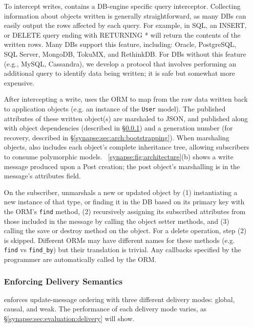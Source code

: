 To intercept writes, \synapse contains a DB-engine specific query interceptor.
Collecting information about objects written is
generally straightforward, as many DBs can easily output the rows affected
by each query. For example, in SQL, an {\code INSERT}, or {\code DELETE}
query ending with {\code RETURNING *} will return the contents of the
written rows. Many DBs support this feature, including: Oracle, PostgreSQL, SQL
Server, MongoDB, TokuMX, and RethinkDB. For DBs without this feature
(e.g., MySQL, Cassandra), we develop a protocol that involves performing an additional
query to identify data being written; it is safe but somewhat more expensive.

After intercepting a write, \synapse uses the ORM to map from the raw data
written back to application objects (e.g. an instance of the {\tt User} model).
The published attributes of these written object(s) are marshaled to JSON, and published
along with object dependencies (described in
\S\ref{synapse:sec:arch:cross-db-causality}) and a generation number (for recovery,
described in \S\ref{synapse:sec:arch:bootstrapping}). When marshaling objects,
\synapse also includes each object's complete inheritance tree, allowing
subscribers to consume polymorphic models.
\F~\ref{synapse:fig:architecture}(b) shows a write message produced
upon a {\code Post} creation; the post object's marshalling is in the message's
{\code attributes} field.

On the subscriber, \synapse unmarshals a new or updated object by (1)
instantiating a new instance of that type, or finding it in the DB based on its primary key with
the ORM's {\tt find} method, (2) recursively assigning its
subscribed attributes from those included in the message by calling the
object setter methods, and (3) calling the {\code save} or {\code
destroy} method on the object. For a delete operation, step (2) is skipped.
Different ORMs may have different names for these methods (e.g. {\tt find} vs
{\tt find\_by}) but their translation is trivial. Any callbacks specified by the
programmer are automatically called by the ORM.

\subsubsection{Enforcing Delivery Semantics} \label{synapse:sec:arch:cross-db-causality}

\synapse enforces update-message ordering with three different
delivery modes: global, causal, and weak. The performance of each delivery mode
varies, as \S\ref{synapse:sec:evaluation:delivery} will show.

